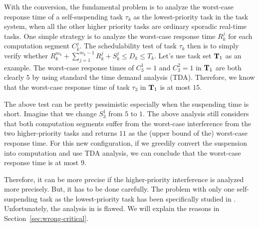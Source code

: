 \begin{itemize}
With the conversion, the fundamental problem is to analyze the worst-case response time of a self-suspending task $\tau_k$ as the lowest-priority task in the task system, when all the other higher priority tasks are ordinary sporadic real-time tasks. One simple strategy is to analyze the worst-case response time $R_k^j$ for each computation segment $C_k^j$. The schedulability test of task $\tau_k$ then is to simply verify whether $R_k^{m_k} + \sum_{j=1}^{m_k-1} R_k^j + S_k^j \leq D_k \leq T_k$. Let's use task set ${\bf T}_1$ as an example. The worst-case response times of $C_3^1=1$ and $C_3^2=1$ in ${\bf T}_1$ are both clearly $5$ by using standard the time demand analysis (TDA). Therefore, we know that the worst-case response time of task $\tau_3$ in ${\bf T}_1$ is at most $15$.

The above test can be pretty pessimistic especially when the suspending time is short. Imagine that we change $S_3^1$ from $5$ to $1$. The above analysis still considers that both computation segments suffer from the worst-case interference from the two higher-priority tasks and returns $11$ as the (upper bound of the) worst-case response time. For this new configuration, if we greedily convert the suspension into computation and use TDA analysis, we can conclude that the worst-case response time is at most $9$. 

Therefore, it can be more precise if the higher-priority interference is analyzed more precisely. But, it has to be done carefully.
The problem with only one self-suspending task as the lowest-priority task has been specifically studied in \cite{LR:rtas10,ecrts15nelissen}. Unfortunately, the analysis in \cite{LR:rtas10} is flawed. We will explain the reasons in Section~\ref{sec:wrong-critical}.





\end{itemize}
